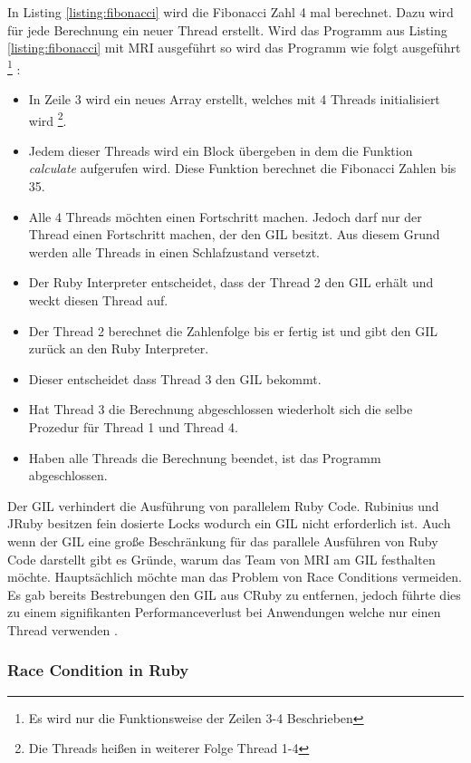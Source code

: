 In Listing \ref{listing:fibonacci} wird die Fibonacci Zahl 4 mal berechnet. Dazu wird für jede Berechnung ein neuer Thread erstellt. Wird das Programm aus Listing \ref{listing:fibonacci} mit MRI ausgeführt so wird das Programm wie folgt ausgeführt \footnote{Es wird nur die Funktionsweise der Zeilen 3-4 Beschrieben} \cite[p. 45-46]{Sto2013}: 

\begin{itemize}
  \item In Zeile 3 wird ein neues Array erstellt, welches mit 4 Threads initialisiert wird \footnote{Die Threads heißen in weiterer Folge Thread 1-4}.
  \item Jedem dieser Threads wird ein Block übergeben in dem die Funktion \emph{calculate} aufgerufen wird. Diese Funktion berechnet die Fibonacci Zahlen bis 35.
  \item Alle 4 Threads möchten einen Fortschritt machen. Jedoch darf nur der Thread einen Fortschritt machen, der den GIL besitzt. Aus diesem Grund werden alle Threads in einen Schlafzustand versetzt.
  \item Der Ruby Interpreter entscheidet, dass der Thread 2 den GIL erhält und weckt diesen Thread auf.
  \item Der Thread 2 berechnet die Zahlenfolge bis er fertig ist und gibt den GIL zurück an den Ruby Interpreter.
  \item Dieser entscheidet dass Thread 3 den GIL bekommt.
  \item Hat Thread 3 die Berechnung abgeschlossen wiederholt sich die selbe Prozedur für Thread 1 und Thread 4.
  \item Haben alle Threads die Berechnung beendet, ist das Programm abgeschlossen.
\end{itemize}

Der GIL verhindert die Ausführung von parallelem Ruby Code. Rubinius und JRuby besitzen fein dosierte Locks wodurch ein GIL nicht erforderlich ist. Auch wenn der GIL eine große Beschränkung für das parallele Ausführen von Ruby Code darstellt gibt es Gründe, warum das Team von MRI am GIL festhalten möchte. Hauptsächlich möchte man das Problem von Race Conditions vermeiden. Es gab bereits Bestrebungen den GIL aus CRuby zu entfernen, jedoch führte dies zu einem signifikanten Performanceverlust bei Anwendungen welche nur einen Thread verwenden \cite[p. 48-49]{Sto2013}.

\subsubsection{Race Condition in Ruby}

